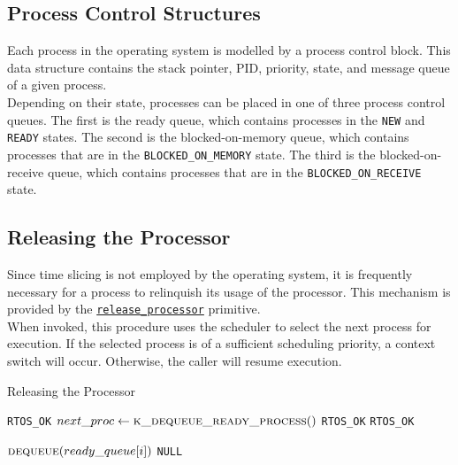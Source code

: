 \documentclass[12pt]{report}
\begin{document}
\subsection{Process Control Structures}

Each process in the operating system is modelled by a process control block. This data structure contains the stack pointer, PID, priority, state, and message queue of a given process.\\

Depending on their state, processes can be placed in one of three process control queues. The first is the ready queue, which contains processes in the \texttt{NEW} and \texttt{READY} states. The second is the blocked-on-memory queue, which contains processes that are in the \texttt{BLOCKED_ON_MEMORY} state. The third is the blocked-on-receive queue, which contains processes that are in the \texttt{BLOCKED_ON_RECEIVE} state.

\subsection{Releasing the Processor}

Since time slicing is not employed by the operating system, it is frequently necessary for a process to relinquish its usage of the processor. This mechanism is provided by the \hyperref[alg:releasingtheprocessor]{\texttt{release_processor}} primitive.\\

When invoked, this procedure uses the scheduler to select the next process for execution. If the selected process is of a sufficient scheduling priority, a context switch will occur. Otherwise, the caller will resume execution.\\

\begin{algorithm}
\caption{Releasing the Processor}
\label{alg:releasingtheprocessor}
\begin{algorithmic}[1]
        \State \Return \texttt{RTOS_OK} 
    \EndIf
    \State $next\_proc \leftarrow \Call{k\_dequeue\_ready\_process}{\null}$ 
            \State \Return \texttt{RTOS_OK} 
        \EndIf
    \EndIf
    \State {}
    \State \Return \texttt{RTOS_OK}
\EndProcedure

\Statex

            \State \Return $\Call{dequeue}{ready\_queue[i]}$
        \EndIf
    \EndFor
    \State \Return \texttt{NULL}
\EndProcedure
\end{algorithmic}
\end{algorithm}
\end{document}
